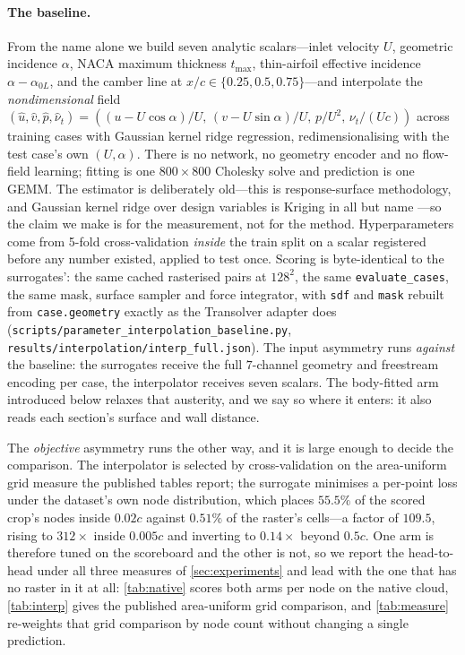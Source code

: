 \paragraph{The baseline.} From the name alone we build seven analytic scalars---inlet
velocity $U$, geometric incidence $\alpha$, NACA maximum thickness $t_{\max}$,
thin-airfoil effective incidence $\alpha-\alpha_{0L}$, and the camber line at
$x/c\in\{0.25,0.5,0.75\}$---and interpolate the \emph{nondimensional} field
$(\hat u,\hat v,\hat p,\hat\nu_t)=((u-U\cos\alpha)/U,\,(v-U\sin\alpha)/U,\,p/U^2,\,
\nu_t/(Uc))$ across training cases with Gaussian kernel ridge regression,
redimensionalising with the test case's own $(U,\alpha)$. There is no network, no
geometry encoder and no flow-field learning; fitting is one $800\times800$ Cholesky
solve and prediction is one GEMM. The estimator is deliberately old---this is
response-surface methodology, and Gaussian kernel ridge over design variables is Kriging
in all but name \citep{queipo2005surrogate}---so the claim we make is for the measurement,
not for the method. Hyperparameters come from 5-fold cross-validation
\emph{inside} the train split on a scalar registered before any number existed, applied
to test once. Scoring is byte-identical to the surrogates': the same cached rasterised
pairs at $128^2$, the same \texttt{evaluate\_cases}, the same mask, surface sampler and
force integrator, with \texttt{sdf} and \texttt{mask} rebuilt from \texttt{case.geometry}
exactly as the Transolver adapter does
(\texttt{scripts\slash{}parameter\_interpolation\_baseline.py},
\texttt{results\slash{}interpolation\slash{}interp\_full.json}). The input asymmetry runs
\emph{against} the baseline: the surrogates receive the full $7$-channel geometry and
freestream encoding per case, the interpolator receives seven scalars. The body-fitted arm
introduced below relaxes that austerity, and we say so where it enters: it also reads each
section's surface and wall distance.

The \emph{objective} asymmetry runs the other way, and it is large enough to decide the
comparison. The interpolator is selected by cross-validation on the area-uniform grid
measure the published tables report; the surrogate minimises a per-point loss under the
dataset's own node distribution, which places $55.5\%$ of the scored crop's nodes inside
$0.02c$ against $0.51\%$ of the raster's cells---a factor of $109.5$, rising to $312\times$ inside $0.005c$
and inverting to $0.14\times$ beyond $0.5c$. One arm is therefore tuned on the scoreboard
and the other is not, so we report the head-to-head under all three measures of
\autoref{sec:experiments} and lead with the one that has no raster in it at all:
\autoref{tab:native} scores both arms per node on the native cloud, \autoref{tab:interp}
gives the published area-uniform grid comparison, and \autoref{tab:measure} re-weights that
grid comparison by node count without changing a single prediction.

